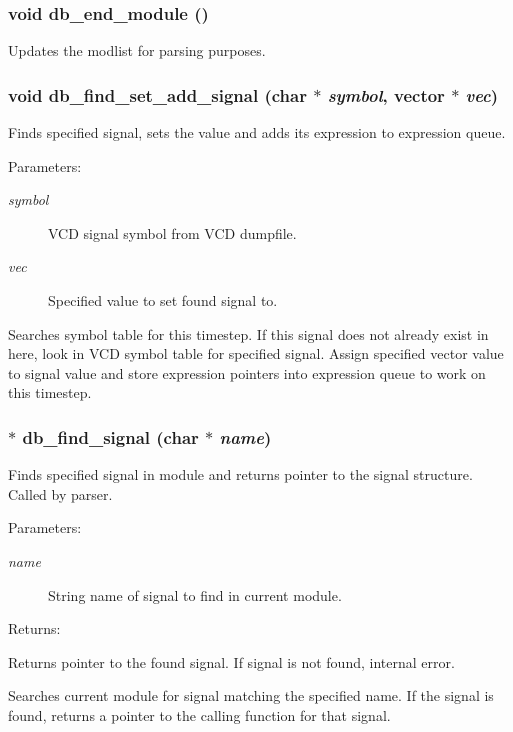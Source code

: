 \subsubsection{\setlength{\rightskip}{0pt plus 5cm}void db\_\-end\_\-module ()}\label{db_8c_a17}


Updates the modlist for parsing purposes. 
\subsubsection{\setlength{\rightskip}{0pt plus 5cm}void db\_\-find\_\-set\_\-add\_\-signal (char $\ast$ {\em symbol}, {\bf vector} $\ast$ {\em vec})}\label{db_8c_a32}


Finds specified signal, sets the value and adds its expression to expression queue.

\begin{Desc}
\item[Parameters: ]\par
\begin{description}
\item[{\em 
symbol}]VCD signal symbol from VCD dumpfile. \item[{\em 
vec}]Specified value to set found signal to.\end{description}
\end{Desc}
Searches symbol table for this timestep. If this signal does not already exist in here, look in VCD symbol table for specified signal. Assign specified vector value to signal value and store expression pointers into expression queue to work on this timestep. 
\subsubsection{$\ast$ db\_\-find\_\-signal (char $\ast$ {\em name})}\label{db_8c_a19}


Finds specified signal in module and returns pointer to the signal structure. Called by parser.

\begin{Desc}
\item[Parameters: ]\par
\begin{description}
\item[{\em 
name}]String name of signal to find in current module.\end{description}
\end{Desc}
\begin{Desc}
\item[Returns: ]\par
Returns pointer to the found signal. If signal is not found, internal error.\end{Desc}
Searches current module for signal matching the specified name. If the signal is found, returns a pointer to the calling function for that signal. 
